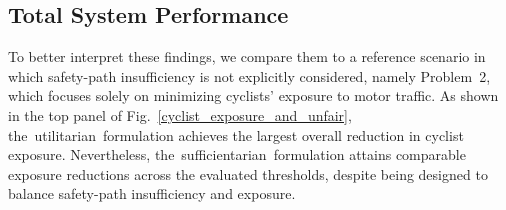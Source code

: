\documentclass[lettersize,journal]{IEEEtran}
\begin{document}



\subsection{Total System Performance}
To better interpret these findings, we compare them to a reference scenario in which safety-path insufficiency is not explicitly considered, namely Problem~2, which focuses solely on minimizing cyclists' exposure to motor traffic. As shown in the top panel of Fig.~\ref{cyclist_exposure_and_unfair}, \mbox{the utilitarian formulation} achieves the largest overall reduction in cyclist exposure. Nevertheless, \mbox{the sufficientarian formulation} attains comparable exposure reductions across the evaluated thresholds, despite being designed to balance safety-path insufficiency and exposure.
\end{document}
